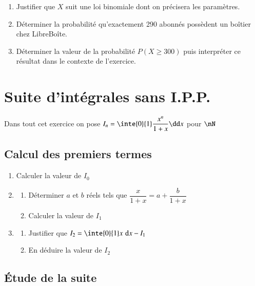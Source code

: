 \documentclass[oneside,12pt]{article}
\let\oldsection\section
\renewcommand{\section}{\newpage\oldsection}
\begin{document}
\begin{enumerate}
    \item Justifier que $X$ suit une loi binomiale dont on précisera les paramètres.
    \item Déterminer la probabilité qu'exactement 290 abonnés possèdent un boîtier chez LibreBoîte\texttrademark.
    \item Déterminer la valeur de la probabilité $P(X\geq300)$ puis interpréter ce résultat dans le contexte de l'exercice.
\end{enumerate}





\section{Suite d'intégrales sans I.P.P.}
Dans tout cet exercice on pose $I_n=\inte{0}{1}\dfrac{x^n}{1+x}\dd x$ \quad pour $\nN$

\subsection{Calcul des premiers termes}
\begin{enumerate}
    \item Calculer la valeur de $I_0$
    \item \begin{enumerate}
        \item Déterminer $a$ et $b$ réels tels que $\dfrac{x}{1+x}=a+\dfrac{b}{1+x}$
        \item Calculer la valeur de $I_1$
    \end{enumerate}
    \item \begin{enumerate}
        \item Justifier que $I_2=\inte{0}{1}x {\,\,\mathrm{d}}x -I_1$
        \item En déduire la valeur de $I_2$
    \end{enumerate}
\end{enumerate}


\subsection{Étude de la suite}
\end{document}
